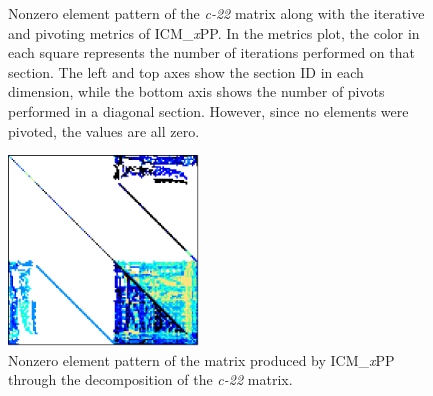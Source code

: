 \begin{figure}[ht!]
\begin{subfigure}[t]{0.51\textwidth}
		\label{Figure:comparing-decomposers-and-solvers->decomposition-project-benchmarks->decomposers-benchmark->comparison-of-execution-times-on-subset-of-matrices->matrix->c-22->icmxpp-metrics}
	\end{subfigure}
	\caption{Nonzero element pattern of the \textit{c-22} matrix along with the iterative and pivoting metrics of ICM\_\textit{x}PP.
		In the metrics plot, the color in each square represents the number of iterations performed on that section.
		The left and top axes show the section ID in each dimension, while the bottom axis shows the number of pivots performed in a diagonal section.
		However, since no elements were pivoted, the values are all zero.
	}
	\label{Figure:comparing-decomposers-and-solvers->decomposition-project-benchmarks->decomposers-benchmark->comparison-of-execution-times-on-subset-of-matrices->matrix->c-22}
\end{figure}

\begin{figure}[ht!]
	\centering
	\includegraphics[width=0.45\textwidth, keepaspectratio, clip]{images/ch03/input-matrices/decomposition-benchmarks/c-22_icmxpp.pdf}
	\caption{Nonzero element pattern of the  matrix produced by ICM\_\textit{x}PP through the decomposition of the \textit{c-22} matrix.}
	\label{Figure:comparing-decomposers-and-solvers->decomposition-project-benchmarks->decomposers-benchmark->comparison-of-execution-times-on-subset-of-matrices->matrix->c-22->icmxpp-LU-nonzero-element-pattern}
\end{figure}

